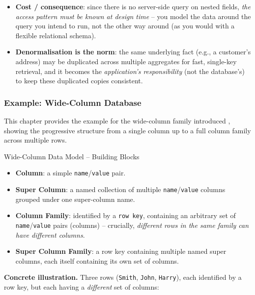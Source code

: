 \begin{itemize}
    \item \textbf{Cost / consequence}: since there is no server-side query on nested fields, \emph{the access pattern must be known at design time} -- you model the data around the query you intend to run, not the other way around (as you would with a flexible relational schema).
    \vspace{0.2cm}
    \item \textbf{Denormalisation is the norm}: the same underlying fact (e.g., a customer's address) may be duplicated across multiple aggregates for fast, single-key retrieval, and it becomes the \emph{application's responsibility} (not the database's) to keep these duplicated copies consistent.
\end{itemize}



\subsubsection{ Example: Wide-Column Database}

This chapter provides the example for the wide-column family introduced , showing the progressive structure from a single column up to a full column family across multiple rows.

\begin{defbox}{Wide-Column Data Model -- Building Blocks}
\begin{itemize}
    \item \textbf{Column}: a simple \texttt{name}/\texttt{value} pair.
    \item \textbf{Super Column}: a named collection of multiple \texttt{name}/\texttt{value} columns grouped under one super-column name.
    \item \textbf{Column Family}: identified by a \texttt{row key}, containing an arbitrary set of \texttt{name}/\texttt{value} pairs (columns) -- crucially, \emph{different rows in the same family can have different columns}.
    \item \textbf{Super Column Family}: a row key containing multiple named super columns, each itself containing its own set of columns.
\end{itemize}
\end{defbox}

\textbf{Concrete illustration.} Three rows (\texttt{Smith}, \texttt{John}, \texttt{Harry}), each identified by a row key, but each having a \emph{different} set of columns:

